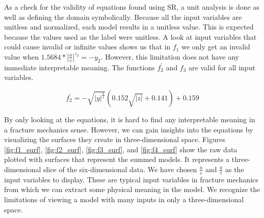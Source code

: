 As a check for the validity of equations found using SR, a unit analysis is done
as well as defining the domain symbolically. Because all the input variables are
unitless and normalized, each model results in a unitless value. This is
expected because the values used as the label were unitless. A look at input
variables that could cause invalid or infinite values shows us that in $f_1$ we
only get an invalid value when $1.5684*|\frac{a}{c}|^{z_2} = -y_2$. However,
this limitation does not have any immediate interpretable meaning. The functions
$f^{'}_{2}$ and $f_3$ are valid for all input variables.

\begin{equation} \label{eq:f_2_simple}
f^{'}_{2} = -\sqrt{|y|^{\frac{a}{t}}}(0.152\sqrt{|z|} + 0.141) + 0.159
\end{equation}

By only looking at the equations, it is hard to find any interpretable meaning
in a fracture mechanics sense. However, we can gain insights into the equations
by visualizing the surfaces they create in three-dimensional space. Figures
\ref{fig:f1_surf}, \ref{fig:f2_surf}, \ref{fig:f3_surf}, and \ref{fig:f4_surf}
show the raw data plotted with surfaces that represent the summed models. It
represents a three-dimensional slice of the six-dimensional data. We have chosen
$\frac{a}{c}$ and $\frac{a}{t}$ as the input variables to display. These are
typical input variables in fracture mechanics from which we can extract some
physical meaning in the model. We recognize the limitations of viewing a
model with many inputs in only a three-dimensional space.

